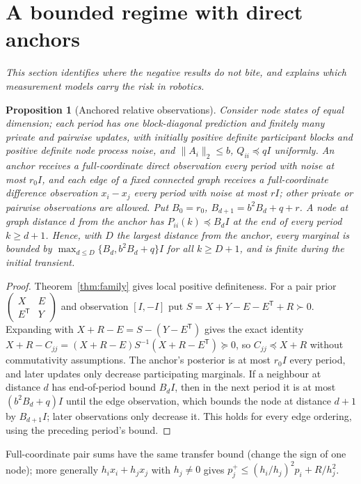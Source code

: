\documentclass[11pt,a4paper]{article}
\numberwithin{equation}{section}
\newtheorem{proposition}[theorem]{Proposition}
\theoremstyle{remark}\newtheorem{remark}[theorem]{Remark}
\newcommand{\T}{^{\mathsf T}}
\begin{document}
\section{A bounded regime with direct anchors}\label{sec:anchor}

\emph{This section identifies where the negative results do not bite, and explains which
measurement models carry the risk in robotics.}

\begin{proposition}[Anchored relative observations]\label{prop:anchor}
Consider node states of equal dimension; each period has one block-diagonal prediction and
finitely many private and pairwise updates, with initially positive definite participant
blocks and positive definite node process noise, and $\|A_i\|_2\le b$, $Q_{ii}\preceq qI$
uniformly. An anchor receives a full-coordinate direct observation every period with noise at
most $r_0I$, and each edge of a fixed connected graph receives a full-coordinate difference
observation $x_i-x_j$ every period with noise at most $rI$; other private or pairwise
observations are allowed. Put $B_0=r_0$, $B_{d+1}=b^2B_d+q+r$. A node at graph distance $d$ from
the anchor has $P_{ii}(k)\preceq B_dI$ at the end of every period $k\ge d+1$. Hence, with $D$ the
largest distance from the anchor, every marginal is bounded by $\max_{d\le D}\{B_d,b^2B_d+q\}I$
for all $k\ge D+1$, and is finite during the initial transient.
\end{proposition}

\begin{proof}
Theorem~\ref{thm:family} gives local positive definiteness. For a pair prior
$\left(\begin{smallmatrix}X&E\\E\T&Y\end{smallmatrix}\right)$ and observation $[I,-I]$ put
$S=X+Y-E-E\T+R\succ0$. Expanding with $X+R-E=S-(Y-E\T)$ gives the exact identity
$X+R-C_{jj}=(X+R-E)S^{-1}(X+R-E\T)\succeq0$, so $C_{jj}\preceq X+R$ without commutativity
assumptions. The anchor's posterior is at most $r_0I$ every period, and later updates only
decrease participating marginals. If a neighbour at distance $d$ has end-of-period bound
$B_dI$, then in the next period it is at most $(b^2B_d+q)I$ until the edge observation, which
bounds the node at distance $d+1$ by $B_{d+1}I$; later observations only decrease it. This
holds for every edge ordering, using the preceding period's bound.
\end{proof}

Full-coordinate pair sums have the same transfer bound (change the sign of one node); more
generally $h_ix_i+h_jx_j$ with $h_j\ne0$ gives $p_j^+\le(h_i/h_j)^2p_i+R/h_j^2$.
\end{document}
